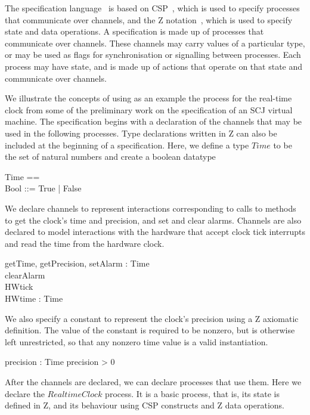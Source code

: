 \documentclass[a4paper,10pt]{report}
\begin{document}
The \Circus{} specification language~\cite{oliveira2009} is based on
CSP~\cite{roscoe2011}, which is used to specify processes that communicate over
channels, and the Z notation~\cite{woodcock1996}, which is used to specify state
and data operations.  A \Circus{} specification is made up of processes that
communicate over channels.  These channels may carry values of a particular
type, or may be used as flags for synchronisation or signalling between
processes.  Each process may have state, and is made up of actions that operate
on that state and communicate over channels.

We illustrate the concepts of \Circus{} using as an example the process for
the real-time clock from some of the preliminary work on the specification of an
SCJ virtual machine. The specification begins with a declaration of the channels
that may be used in the following processes.  Type declarations written in Z can
also be included at the beginning of a \Circus{} specification. Here, we define
a type $Time$ to be the set of natural numbers and create a boolean datatype
%
\begin{zed}
  Time == \nat \\
  Bool ::= True | False \\
\end{zed}
%
We declare channels to represent interactions corresponding to calls to methods
to get the clock's time and precision, and set and clear alarms. Channels are
also declared to model interactions with the hardware that accept clock tick
interrupts and read the time from the hardware clock.
%
\begin{circus}
  \circchannel getTime, getPrecision, setAlarm : Time \\
  \circchannel clearAlarm \\
  \circchannel HWtick \\
  \circchannel HWtime : Time \\
\end{circus}
%
We also specify a constant to represent the clock's precision using a Z
axiomatic definition. The value of the constant is required to be nonzero, but is
otherwise left unrestricted, so that any nonzero time value is a valid
instantiation.
%
\begin{axdef}
  precision : Time
\where
  precision > 0
\end{axdef}
%
After the channels are declared, we can declare processes that use them. Here we
declare the $RealtimeClock$ process. It is a basic process, that is, its state
is defined in Z, and its behaviour using CSP constructs and Z data operations.
\end{document}
